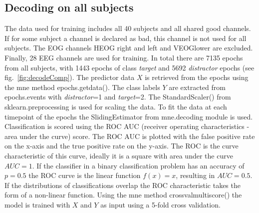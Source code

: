 \documentclass[a4paper]{article}
\begin{document}
\subsection{Decoding on all subjects}
The data used for training includes all 40 subjects and all shared good channels.
If for some subject a channel is declared as bad, this channel is not used for all subjects.
The EOG channels HEOG right and left and VEOG\textunderscore lower are excluded.
Finally, 28 EEG channels are used for training.
In total there are 7135 epochs from all subjects, with 1443 epochs of class \textit{target} and 5692 \textit{distractor} epochs (see fig.~\ref{fig:decodeComp}).
The predictor data $X$ is retrieved from the epochs using the mne method epochs.get\textunderscore data().
The class labels $Y$ are extracted from epochs.events with \textit{distractor}=1 and \textit{target}=2.
The StandardScaler() from sklearn.preprocessing is used for scaling the data.
To fit the data at each timepoint of the epochs the SlidingEstimator from mne.decoding module is used.
Classification is scored using the ROC AUC (receiver operating characteristics - area under the curve) score.
The ROC AUC is plotted with the false positive rate on the x-axis and the true positive rate on the y-axis.
The ROC is the curve characteristic of this curve, ideally it is a square with area under the curve $AUC=1$.
If the classifier in a binary classification problem has an accuracy of $p=0.5$ the ROC curve is the linear function $f(x) =x$, resulting in $AUC=0.5$.
If the distributions of classifications overlap the ROC characteristic takes the form of a non-linear function.
Using the mne method cross\textunderscore val\textunderscore multiscore() the model is trained with $X$ and $Y$ as input using a 5-fold cross validation.
\end{document}
